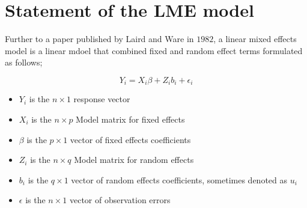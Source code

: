 \section{Statement of the LME model}

Further to a paper published by Laird and Ware in $1982$, a linear mixed effects model is a linear mdoel that combined fixed and random effect terms formulated as follows;

  \begin{displaymath}
      Y_{i} =X_{i}\beta + Z_{i}b_{i} + \epsilon_{i}
  \end{displaymath}
\begin{itemize}

\item $Y_{i}$ is the $n \times 1$ response vector \item $X_{i}$ is
the $n \times p$ Model matrix for fixed effects \item $\beta$ is
the $p \times 1$ vector of fixed effects coefficients \item
$Z_{i}$ is the $n \times q$ Model matrix for random effects \item
$b_{i}$ is the $q \times 1$ vector of random effects coefficients,
sometimes denoted as $u_{i}$ \item $\epsilon$ is the $n \times 1$
vector of observation errors
\end{itemize}

